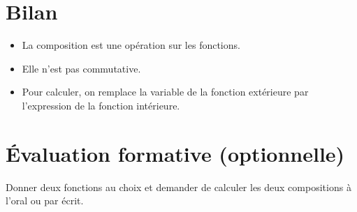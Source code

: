 \documentclass[12pt,a4paper]{article}
\begin{document}
\section*{Bilan}
\begin{tcolorbox}[colback=gray!5!white, colframe=black!75!black]
\begin{itemize}
    \item La composition est une opération sur les fonctions.
    \item Elle n'est pas commutative.
    \item Pour calculer, on remplace la variable de la fonction extérieure par l'expression de la fonction intérieure.
\end{itemize}
\end{tcolorbox}

\section*{Évaluation formative (optionnelle)}
Donner deux fonctions au choix et demander de calculer les deux compositions à l'oral ou par écrit.
\end{document}

